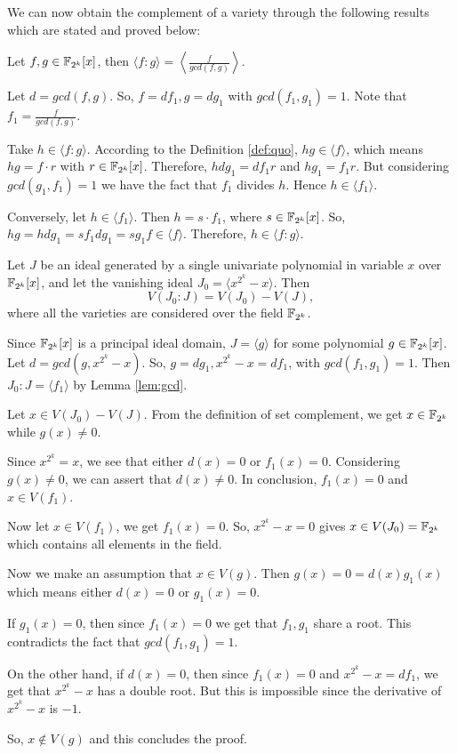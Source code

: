 We can now obtain the complement of a variety through the following
results which are stated and proved below:

\begin{Lemma}
\label{lem:gcd}
Let $f,g\in {\mathbb{F}}_{2^k}[x]$, then $\langle f:g\rangle = \left\langle\frac{f}{gcd(f,g)}\right\rangle$.
\end{Lemma}

\begin{Proof}
Let $d = gcd(f, g)$. So, $f = df_1 , g = dg_1$ with $gcd(f_1 , g_1 ) =
1$. Note that $f_1 = \frac{f}{gcd(f,g)}$.

Take $h \in \langle f : g\rangle$. According to the
Definition \ref{def:quo}, $hg \in \langle f \rangle$, which means $hg = f
\cdot r$ with $r \in {\mathbb{F}}_{2^k}[x]$. Therefore, $hdg_1 = df_1 r$ and $hg_1 =
f_1 r$. But considering $gcd(g_1 , f_1 ) = 1$ we have the fact that
$f_1$ divides $h$. Hence $h \in \langle f_1\rangle$.

Conversely, let $h \in \langle f_1 \rangle$. Then $h = s \cdot f_1$,
where $s \in {\mathbb{F}}_{2^k}[x]$. So, $hg = hdg_1 = sf_1 dg_1 = sg_1 f \in 
\langle f \rangle$. Therefore, $h \in \langle f : g\rangle$.
\end{Proof}


\begin{Theorem}
\label{thm:quotient}
Let $J$ be an ideal generated by a single univariate polynomial in
variable $x$ over ${\mathbb{F}}_{2^k}[x]$, and let the vanishing ideal $J_0 = \langle
x^{2^k}-x\rangle$. Then  
$${ V}(J_0:J) = { V}(J_0) - { V}(J),$$ where all the varieties are
considered over the field ${\mathbb{F}}_{2^k}$. 
\end{Theorem}

\begin{Proof}
Since ${\mathbb{F}}_{2^k}[x]$ is a principal ideal domain, $ J = \langle g\rangle$
for some polynomial $ g \in {\mathbb{F}}_{2^k}[x]$. Let $d = gcd(g, x^{2^k} -
x)$. So, $g = dg_1 , x^{2^k} - x = df_1$, with $gcd(f_1 , g_1 ) =
1$. Then $J_0 : J = \langle f_1 \rangle$ by Lemma \ref{lem:gcd}. 

Let $x \in V(J_0 ) - V(J)$. From the definition of set
complement, we get $x \in {\mathbb{F}}_{2^k}$ while $g(x) \neq 0$.  

Since $x^{2^k} = x$, we see that either $d(x) = 0$ or $f_1 (x) =
0$. Considering $g(x) \neq 0$, we can assert that $d(x) \neq 0$. In
conclusion, $f_1 (x) = 0$ and $x \in V(f_1 )$. 

Now let $x \in V(f_1 )$, we get $f_1 (x) = 0$. So, $x^{2^k} - x = 0$
gives $x \in V(J_0) = {\mathbb{F}}_{2^k}$ which  contains all elements in the
field. 

Now we make an assumption that $x \in V(g)$. Then $g(x) = 0 =
d(x)g_1(x)$ which means either $d(x) = 0$ or $g_1 (x) = 0$. 

If $g_1 (x) = 0$, then since $f_1 (x) = 0$ we get that $f_1 , g_1$
share a root. This contradicts the fact that $gcd(f_1 , g_1 ) = 1$.

On the other hand, if $d(x) = 0$, then since $f_1 (x) = 0$ and
$x^{2^k} - x = df_1$, we get that $x^{2^k} - x$ has a double root. 
But this is impossible since the derivative of $x^{2^k} - x$ is $-1$.

So, $x \notin V(g)$ and this concludes the proof.
\end{Proof}

